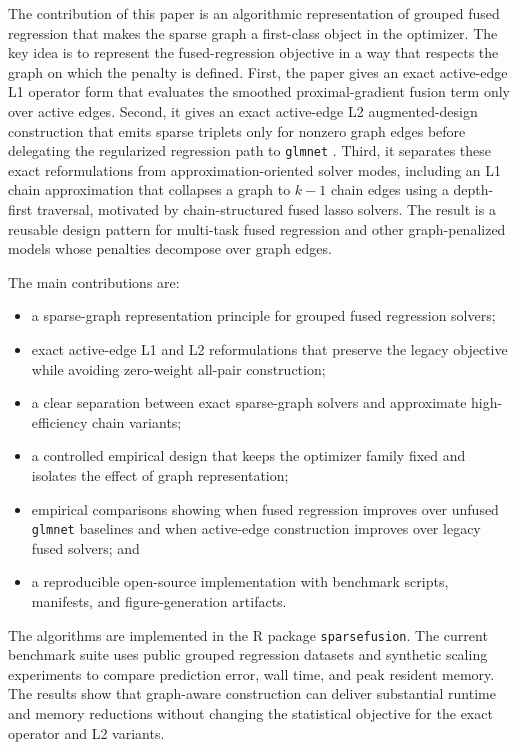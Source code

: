 \documentclass[twoside,11pt]{article}
\newcommand{\sparsefusion}{\texttt{sparsefusion}\xspace}
\begin{document}
The contribution of this paper is an algorithmic representation of grouped
fused regression that makes the sparse graph a first-class object in the
optimizer. The key idea is to represent the fused-regression objective in a
way that respects the graph on which the penalty is defined. First, the paper
gives an exact active-edge L1 operator form that evaluates the smoothed
proximal-gradient fusion term only over active edges. Second, it gives an
exact active-edge L2 augmented-design construction that emits sparse triplets
only for nonzero graph edges before delegating the regularized regression path
to \texttt{glmnet} \citep{glmnet}. Third, it separates these exact
reformulations from approximation-oriented solver modes, including an
L1 chain approximation that collapses a graph to $k-1$ chain edges
using a depth-first traversal, motivated by chain-structured fused lasso
solvers. The result is a reusable design pattern for multi-task fused
regression and other graph-penalized models whose penalties decompose over
graph edges.

The main contributions are:
\begin{itemize}
\item a sparse-graph representation principle for grouped fused regression
solvers;
\item exact active-edge L1 and L2 reformulations that preserve the legacy
objective while avoiding zero-weight all-pair construction;
\item a clear separation between exact sparse-graph solvers and approximate
high-efficiency chain variants;
\item a controlled empirical design that keeps the optimizer family fixed and
isolates the effect of graph representation;
\item empirical comparisons showing when fused regression improves over
unfused \texttt{glmnet} baselines and when active-edge construction improves
over legacy fused solvers; and
\item a reproducible open-source implementation with benchmark scripts,
manifests, and figure-generation artifacts.
\end{itemize}

The algorithms are implemented in the R package \sparsefusion. The current
benchmark suite uses public grouped regression datasets and synthetic scaling
experiments to compare prediction error, wall time, and peak resident memory.
The results show that graph-aware construction can deliver substantial runtime
and memory reductions without changing the statistical objective for the exact
operator and L2 variants.
\end{document}
